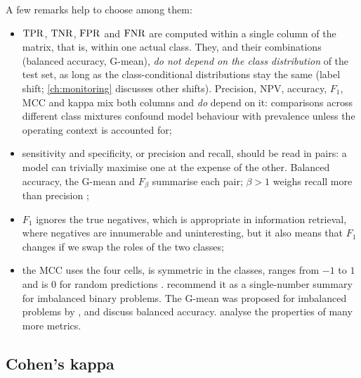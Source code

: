 A few remarks help to choose among them:
\begin{itemize}
  \item $\mathrm{TPR}$, $\mathrm{TNR}$, $\mathrm{FPR}$ and $\mathrm{FNR}$ are computed within a single column of the matrix,
        that is, within one actual class. They, and their combinations (balanced accuracy,
        G-mean), \emph{do not depend on the class distribution} of the test set, as long as the
        class-conditional distributions stay the same (label shift; \cref{ch:monitoring} discusses other shifts). Precision,
        NPV, accuracy, $F_1$, MCC and kappa mix both columns and \emph{do} depend on it:
        comparisons across different class mixtures confound model behaviour with prevalence
        unless the operating context is accounted for;
  \item sensitivity and specificity, or precision and recall, should be read in pairs: a model
        can trivially maximise one at the expense of the other. Balanced accuracy, the
        G-mean and $F_\beta$ summarise each pair; $\beta>1$ weighs recall more than
        precision \citep{vanrijsbergen1979information};
  \item $F_1$ ignores the true negatives, which is appropriate in information retrieval,
        where negatives are innumerable and uninteresting, but it also means that $F_1$
        changes if we swap the roles of the two classes;
  \item the MCC uses the four cells, is symmetric in the classes, ranges from $-1$ to $1$ and
        is 0 for random predictions \citep{matthews1975comparison}. \citet{chicco2020advantages} recommend it as a single-number
        summary for imbalanced binary problems. The G-mean
        was proposed for imbalanced problems by \citet{kubat1997addressing}, and
        \citet{brodersen2010balanced} discuss balanced accuracy.
        \citet{sokolova2009systematic} analyse the properties of many more metrics.
\end{itemize}

\subsection{Cohen's kappa}


